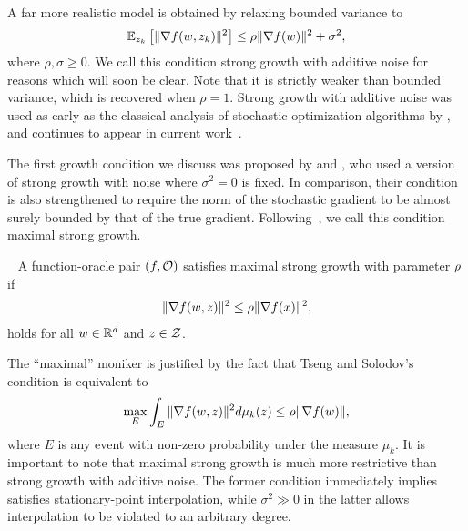A far more realistic model is obtained by relaxing bounded variance to 
\[ \Ek \sbr{\norm{\grad(\w, \zk)}^2} \leq \rho \norm{\grad(\w)}^2 + \sigma^2,  \]
where \( \rho, \sigma \geq 0 \).
We call this condition strong growth with additive noise for reasons which will soon be clear.
Note that it is strictly weaker than bounded variance, which is recovered when \( \rho = 1 \).
Strong growth with additive noise was used as early as the classical analysis of stochastic optimization algorithms by \citet{poljak1973pseudogradient}, and continues to appear in current work~\citep{bertsekas2000gradient, khaled2020better, nguyen2018sgd}. 


The first growth condition we discuss was proposed by \citet{tseng1998incremental} and \citet{solodov1998incremental}, who used a version of strong growth with noise where \( \sigma^2 = 0 \) is fixed. 
In comparison, their condition is also strengthened to require the norm of the stochastic gradient to be almost surely bounded by that of the true gradient.
Following~\citet{khaled2020better}, we call this condition maximal strong growth.
\begin{definition}~\label{def:maximal-sg}
    A function-oracle pair \( \rbr{f, \oracle{}} \) satisfies maximal strong growth with parameter \( \sgc \) if  
    \begin{align*}
        \norm{\grad(\w, \z)}^2 \leq \sgc \norm{\grad(x)}^2, 
    \end{align*}
    holds for all \( \w \in \R^d \) and \( \z \in \calZ \).
\end{definition}
\noindent The ``maximal'' moniker is justified by the fact that Tseng and Solodov's condition is equivalent to 
    \[ \max_{E} \int_{E} \norm{\grad(\w, \z)}^2 d\mu_k(\z) \leq \sgc \norm{\grad(\w)}, \]
where \( E \) is any event with non-zero probability under the measure \( \mu_k \). 
It is important to note that maximal strong growth is much more restrictive than strong growth with additive noise.
The former condition immediately implies \oracle{} satisfies stationary-point interpolation, while \( \sigma^2 \gg 0 \) in the latter allows interpolation to be violated to an arbitrary degree. 

